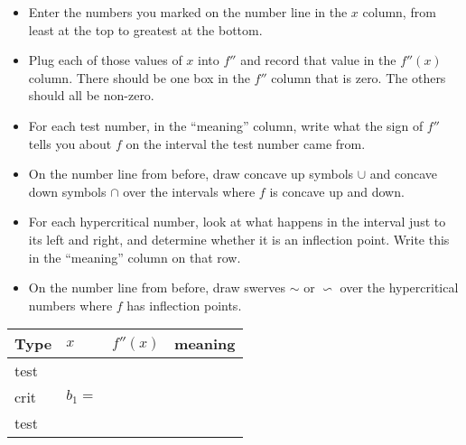 \begin{ProblemSet}
\begin{Problem}[pencil space=0in]
 \end{Problem}

 \begin{Problem}[pencil space=0in]
  \begin{itemize}
  \item Enter the numbers you marked on the number line in the $x$ column, from least at the top to greatest at the bottom.
  \item Plug each of those values of $x$ into $f''$ and record that value in the $f''(x)$ column.
   There should be one box in the $f''$ column that is zero.
   The others should all be non-zero.
  \item For each test number, in the ``meaning'' column, write what the sign of $f''$ tells you about $f$ on the interval the test number came from.
  \item On the number line from before, draw concave up symbols $\cup$ and concave down symbols $\cap$ over the intervals where $f$ is concave up and down.
  \item For each hypercritical number, look at what happens in the interval just to its left and right, and determine whether it is an inflection point.
   Write this in the ``meaning'' column on that row.
  \item On the number line from before, draw swerves $\sim$ or $\backsim$ over the hypercritical numbers where $f$ has inflection points.
  \end{itemize}
  \bigskip

  \newcommand{\Bx}[1]{\Strut[-0.25in]{0.75in}#1}
  \begin{tabular}{l|p{1in}|p{1in}|p{3in}}
    Type & $x$ & $f''(x)$ & meaning
    \\ \hline
    \Bx{test} & & &
    \\ \hline
    \Bx{crit} & \Bx{$b_1 = $} & &
    \\ \hline
    \Bx{test} & & &
    \\ \hline
  \end{tabular}


\end{Problem}
\end{ProblemSet}
